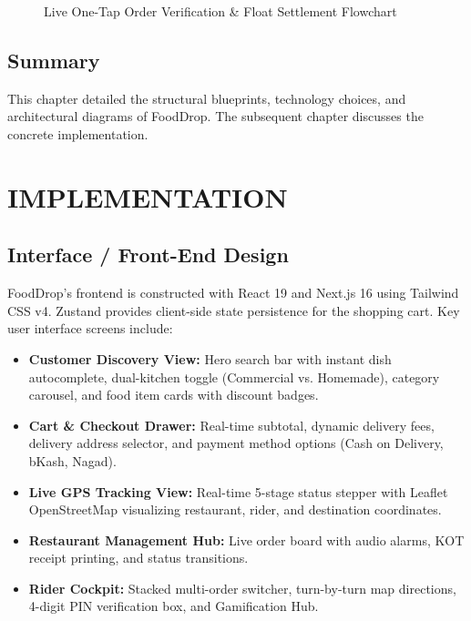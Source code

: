 \documentclass[12pt,a4paper]{report}
\begin{document}
\begin{figure}[h!]
    \caption{Live One-Tap Order Verification \& Float Settlement Flowchart}
    \label{fig:flowchart}
\end{figure}

\section{Summary}
This chapter detailed the structural blueprints, technology choices, and architectural diagrams of FoodDrop. The subsequent chapter discusses the concrete implementation.

\newpage

\chapter{IMPLEMENTATION}

\section{Interface / Front-End Design}
FoodDrop's frontend is constructed with React 19 and Next.js 16 using Tailwind CSS v4. Zustand provides client-side state persistence for the shopping cart. Key user interface screens include:
\begin{itemize}
    \item \textbf{Customer Discovery View:} Hero search bar with instant dish autocomplete, dual-kitchen toggle (Commercial vs. Homemade), category carousel, and food item cards with discount badges.
    \item \textbf{Cart \& Checkout Drawer:} Real-time subtotal, dynamic delivery fees, delivery address selector, and payment method options (Cash on Delivery, bKash, Nagad).
    \item \textbf{Live GPS Tracking View:} Real-time 5-stage status stepper with Leaflet OpenStreetMap visualizing restaurant, rider, and destination coordinates.
    \item \textbf{Restaurant Management Hub:} Live order board with audio alarms, KOT receipt printing, and status transitions.
    \item \textbf{Rider Cockpit:} Stacked multi-order switcher, turn-by-turn map directions, 4-digit PIN verification box, and Gamification Hub.
\end{itemize}
\end{document}
